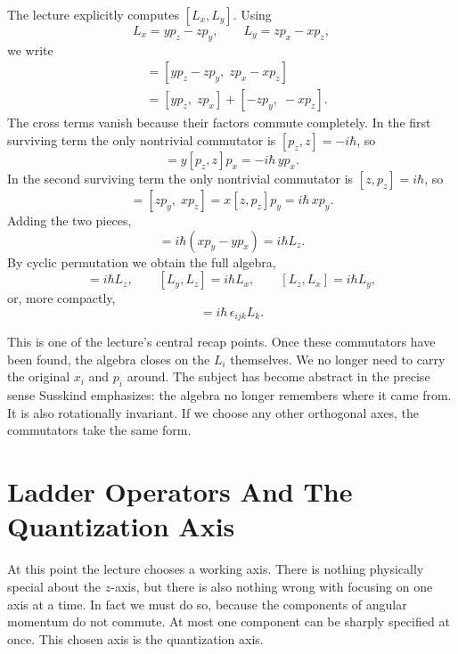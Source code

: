 The lecture explicitly computes \([L_x,L_y]\). Using
\[
L_x=yp_z-zp_y,\qquad L_y=zp_x-xp_z,
\]
we write
\begin{align}
[L_x,L_y]
&=[yp_z-zp_y,\;zp_x-xp_z] \\
&=[yp_z,\;zp_x]+[-zp_y,\;-xp_z].
\end{align}
The cross terms vanish because their factors commute completely. In the first surviving term the only nontrivial commutator is \( [p_z,z]=-i\hbar \), so
\begin{equation}
[yp_z,\;zp_x]=y[p_z,z]p_x=-i\hbar\,yp_x.
\end{equation}
In the second surviving term the only nontrivial commutator is \( [z,p_z]=i\hbar \), so
\begin{equation}
[-zp_y,\;-xp_z]=[zp_y,\;xp_z]=x[z,p_z]p_y=i\hbar\,xp_y.
\end{equation}
Adding the two pieces,
\begin{equation}
[L_x,L_y]=i\hbar(xp_y-yp_x)=i\hbar L_z.
\end{equation}
By cyclic permutation we obtain the full algebra,
\begin{equation}
[L_x,L_y]=i\hbar L_z,\qquad
[L_y,L_z]=i\hbar L_x,\qquad
[L_z,L_x]=i\hbar L_y,
\end{equation}
or, more compactly,
\begin{equation}
[L_i,L_j]=i\hbar\,\epsilon_{ijk}L_k.
\end{equation}

This is one of the lecture's central recap points. Once these commutators have been found, the algebra closes on the \(L_i\) themselves. We no longer need to carry the original \(x_i\) and \(p_i\) around. The subject has become abstract in the precise sense Susskind emphasizes: the algebra no longer remembers where it came from. It is also rotationally invariant. If we choose any other orthogonal axes, the commutators take the same form.

\section{Ladder Operators And The Quantization Axis}

At this point the lecture chooses a working axis. There is nothing physically special about the \(z\)-axis, but there is also nothing wrong with focusing on one axis at a time. In fact we must do so, because the components of angular momentum do not commute. At most one component can be sharply specified at once. This chosen axis is the quantization axis.

